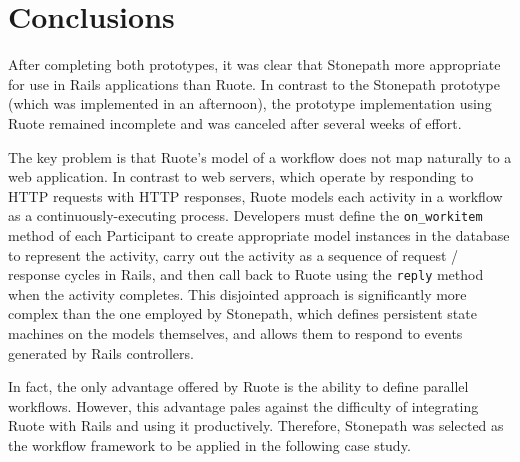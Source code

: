 \documentclass[document.tex]{subfiles}
\begin{document}
\section {Conclusions}

After completing both prototypes, it was clear that Stonepath more appropriate for use in Rails applications than Ruote. In contrast to the Stonepath prototype (which was implemented in an afternoon), the prototype implementation using Ruote remained incomplete and was canceled after several weeks of effort.

The key problem is that Ruote's model of a workflow does not map naturally to a web application. In contrast to web servers, which operate by responding to HTTP requests with HTTP responses, Ruote models each activity in a workflow as a continuously-executing process. Developers must define the \verb!on_workitem! method of each Participant to create appropriate model instances in the database to represent the activity, carry out the activity as a sequence of request / response cycles in Rails, and then call back to Ruote using the \verb!reply! method when the activity completes. This disjointed approach is significantly more complex than the one employed by Stonepath, which defines persistent state machines on the models themselves, and allows them to respond to events generated by Rails controllers.

In fact, the only advantage offered by Ruote is the ability to define parallel workflows. However, this advantage pales against the difficulty of integrating Ruote with Rails and using it productively. Therefore, Stonepath was selected as the workflow framework to be applied in the following case study.
\end{document}
